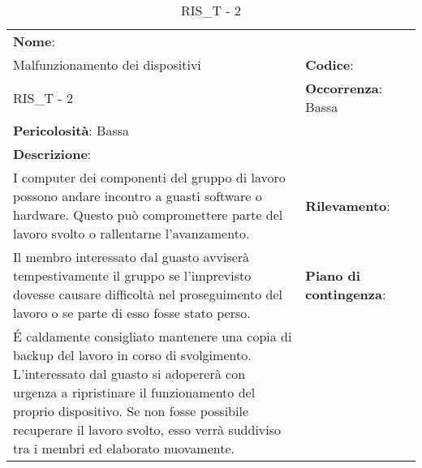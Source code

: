 \renewcommand{\arraystretch}{1.5}
\begin{longtable} { 
		>{\raggedright}p{} 
		>{\raggedright}p{} 
		>{\raggedright}p{}    }
	
	\caption{RIS\_T - 2} \endhead	
	
	
	\textbf{Nome}: \\ Malfunzionamento dei dispositivi
	& \textbf{Codice}: \\ RIS\_T - 2  
	& \textbf{Occorrenza}: Bassa \\ \textbf{Pericolosità}: Bassa
	
	\tabularnewline
	
	\textbf{Descrizione}: \\ I computer dei componenti del gruppo di lavoro possono andare incontro a guasti software o hardware. Questo può compromettere parte del lavoro svolto o rallentarne l'avanzamento.
	& 
	\textbf{Rilevamento}: \\ Il membro interessato dal guasto avviserà tempestivamente il gruppo se l'imprevisto dovesse causare difficoltà nel proseguimento del lavoro o se parte di esso fosse stato perso.
		
	&  
	\textbf{Piano di contingenza}: \\ \'E caldamente consigliato mantenere una copia di backup del lavoro in corso di svolgimento. L'interessato dal guasto si adopererà con urgenza a ripristinare il funzionamento del proprio dispositivo. Se non fosse possibile recuperare il lavoro svolto, esso verrà suddiviso tra i membri ed elaborato nuovamente.
	
\end{longtable}



